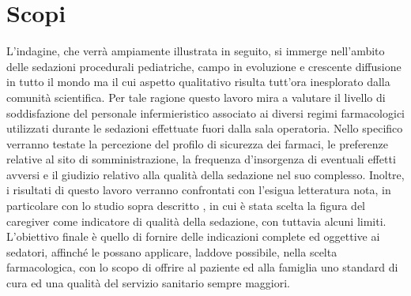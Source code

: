 \section{Scopi}

L'indagine, che verrà ampiamente illustrata in seguito, si immerge nell'ambito delle sedazioni procedurali pediatriche, campo in evoluzione e crescente diffusione in tutto il mondo ma il cui aspetto qualitativo risulta tutt'ora inesplorato dalla comunità scientifica.
Per tale ragione questo lavoro mira a valutare il livello di soddisfazione del personale infermieristico associato ai diversi regimi farmacologici utilizzati durante le sedazioni effettuate fuori dalla sala operatoria. Nello specifico verranno testate la percezione del profilo di sicurezza dei farmaci, le preferenze relative al sito di somministrazione, la frequenza d'insorgenza di eventuali effetti avversi e il giudizio relativo alla qualità della sedazione nel suo complesso.
Inoltre, i risultati di questo lavoro verranno confrontati con l'esigua letteratura nota, in particolare con lo studio sopra descritto \cite{Cortellazzo2022}, in cui è stata scelta la figura del caregiver come indicatore di qualità della sedazione, con tuttavia alcuni limiti. L'obiettivo finale è quello di fornire delle indicazioni complete ed oggettive ai sedatori, affinché le possano applicare, laddove possibile, nella scelta farmacologica, con lo scopo di offrire al paziente ed alla famiglia uno standard di cura ed una qualità del servizio sanitario sempre maggiori.





